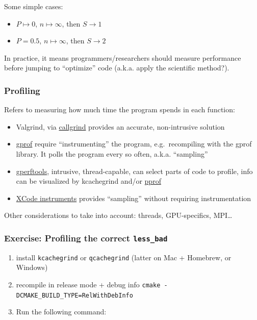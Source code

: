 Some simple cases:

\begin{itemize}
\itemsep1pt\parskip0pt
\item
  $P \mapsto 0$, $n \mapsto \infty$, then $S \rightarrow 1$
\item
  $P=0.5$, $n \mapsto \infty$, then $S \rightarrow 2$
\end{itemize}

In practice, it means programmers/researchers should measure performance
before jumping to ``optimize'' code (a.k.a. apply the scientific
method?).

\subsubsection{Profiling}\label{profiling}

Refers to measuring how much time the program spends in each function:

\begin{itemize}
\itemsep1pt\parskip0pt
\item
  Valgrind, via
  \href{http://valgrind.org/docs/manual/cl-manual.html}{callgrind}
  provides an accurate, non-intrusive solution
\item
  \href{https://sourceware.org/binutils/docs/gprof/}{gprof} require
  ``instrumenting'' the program, e.g.~recompiling with the gprof
  library. It polls the program every so often, a.k.a. ``sampling''
\item
  \href{{[}https://github.com/gperftools/gperftools}{gperftools},
  intrusive, thread-capable, can select parts of code to profile, info
  can be visualized by kcachegrind and/or
  \href{https://github.com/google/pprof}{pprof}
\item
  \href{https://developer.apple.com/library/content/documentation/DeveloperTools/Conceptual/InstrumentsUserGuide/}{XCode
  instruments} provides ``sampling'' without requiring instrumentation
\end{itemize}

Other considerations to take into account: threads, GPU-specifics,
MPI\ldots{}

\subsubsection{Exercise: Profiling the correct
\texttt{less\_bad}}\label{exercise-profiling-the-correct-lessux5fbad}

\begin{enumerate}
\def\labelenumi{\arabic{enumi}.}
\itemsep1pt\parskip0pt
\item
  install \texttt{kcachegrind} or \texttt{qcachegrind} (latter on Mac +
  Homebrew, or Windows)
\item
  recompile in release mode + debug info
  \texttt{cmake -DCMAKE\_BUILD\_TYPE=RelWithDebInfo}
\item
  Run the following command:
\end{enumerate}

